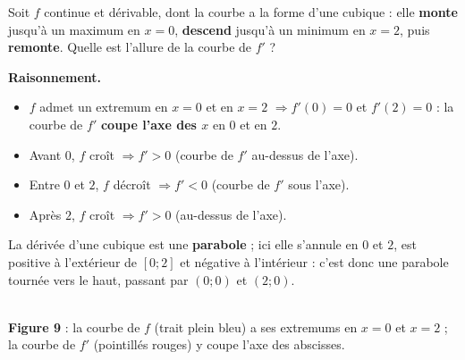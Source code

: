 \documentclass[11pt,a4paper]{article}
\begin{document}
\begin{exemple}
Soit $f$ continue et dérivable, dont la courbe a la forme d'une cubique : elle \textbf{monte} jusqu'à
un maximum en $x=0$, \textbf{descend} jusqu'à un minimum en $x=2$, puis \textbf{remonte}. Quelle est
l'allure de la courbe de $f'$ ?

\medskip
\textbf{Raisonnement.}
\begin{itemize}[leftmargin=1.6em,topsep=2pt,itemsep=2pt]
  \item $f$ admet un extremum en $x=0$ et en $x=2$ $\Rightarrow f'(0)=0$ et $f'(2)=0$ : la courbe de
        $f'$ \textbf{coupe l'axe des $x$} en $0$ et en $2$.
  \item Avant $0$, $f$ croît $\Rightarrow f'>0$ (courbe de $f'$ au-dessus de l'axe).
  \item Entre $0$ et $2$, $f$ décroît $\Rightarrow f'<0$ (courbe de $f'$ sous l'axe).
  \item Après $2$, $f$ croît $\Rightarrow f'>0$ (au-dessus de l'axe).
\end{itemize}
La dérivée d'une cubique est une \textbf{parabole} ; ici elle s'annule en $0$ et $2$, est positive à
l'extérieur de $[0;2]$ et négative à l'intérieur : c'est donc une parabole tournée vers le haut,
passant par $(0;0)$ et $(2;0)$.
\end{exemple}

\begin{center}
\\[2pt]
{\small\textbf{\textcolor{primary}{Figure 9}} : la courbe de $f$ (trait plein bleu) a ses extremums en
$x=0$ et $x=2$ ; la courbe de $f'$ (pointillés rouges) y coupe l'axe des abscisses.}
\end{center}
\end{document}
